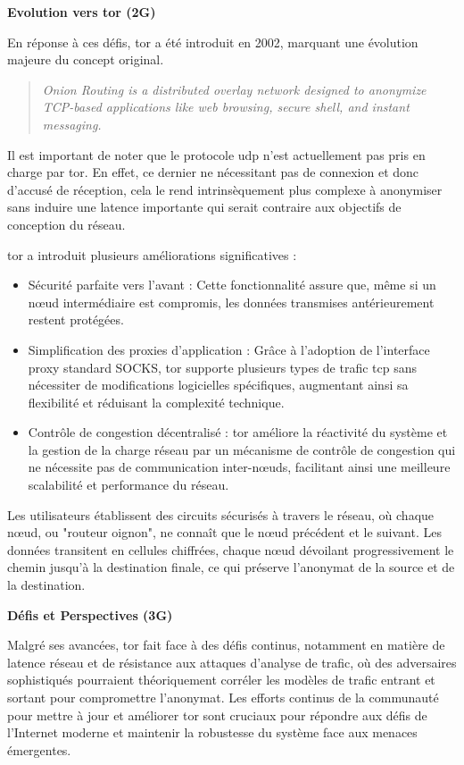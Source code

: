 \textbf{Evolution vers \acrshort{tor} (2G)}

En réponse à ces défis, \acrfull{tor} a été introduit en 2002, marquant une évolution majeure du concept original. 

\begin{quote}
    \textit{Onion Routing is a distributed overlay network designed to anonymize TCP-based applications like web browsing, secure shell, and instant messaging.} \cite[p.~1, sec.~1]{dingledine_tor_2004}
\end{quote}

Il est important de noter que le protocole \acrshort{udp} n'est actuellement pas pris en charge par \acrshort{tor}.
En effet, ce dernier ne nécessitant pas de connexion et donc d'accusé de réception, cela le rend intrinsèquement plus complexe à anonymiser sans induire une latence importante qui serait contraire aux objectifs de conception du réseau.

\acrshort{tor} a introduit plusieurs améliorations significatives :
\begin{itemize}
    \item Sécurité parfaite vers l'avant : Cette fonctionnalité assure que, même si un nœud intermédiaire est compromis, les données transmises antérieurement restent protégées.
    \item Simplification des proxies d'application : Grâce à l'adoption de l'interface proxy standard SOCKS, \acrshort{tor} supporte plusieurs types de trafic \acrshort{tcp} sans nécessiter de modifications logicielles spécifiques, augmentant ainsi sa flexibilité et réduisant la complexité technique.
    \item Contrôle de congestion décentralisé : \acrshort{tor} améliore la réactivité du système et la gestion de la charge réseau par un mécanisme de contrôle de congestion qui ne nécessite pas de communication inter-nœuds, facilitant ainsi une meilleure scalabilité et performance du réseau.
\end{itemize}


Les utilisateurs établissent des circuits sécurisés à travers le réseau, où chaque nœud, ou "routeur oignon", ne connaît que le nœud précédent et le suivant. Les données transitent en cellules chiffrées, chaque nœud dévoilant progressivement le chemin jusqu'à la destination finale, ce qui préserve l'anonymat de la source et de la destination.

\textbf{Défis et Perspectives (3G)}

Malgré ses avancées, \acrshort{tor} fait face à des défis continus, notamment en matière de latence réseau et de résistance aux attaques d'analyse de trafic, où des adversaires sophistiqués pourraient théoriquement corréler les modèles de trafic entrant et sortant pour compromettre l'anonymat. Les efforts continus de la communauté pour mettre à jour et améliorer \acrshort{tor} sont cruciaux pour répondre aux défis de l'Internet moderne et maintenir la robustesse du système face aux menaces émergentes.

